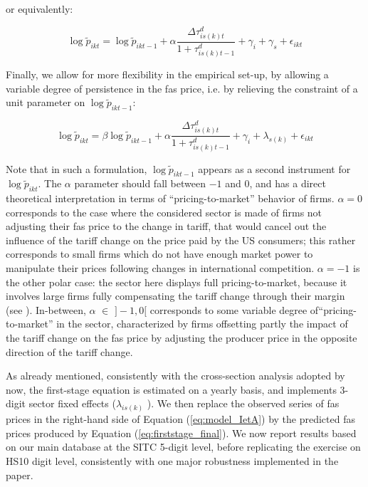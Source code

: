 \documentclass[a4paper,11pt]{article}
\begin{document}
or equivalently:

\begin{equation}
\log \widetilde{p}_{ikt} = \log \widetilde{p}_{ikt-1} + \alpha\frac{\Delta \tau^d_{is(k)t}}{1+\tau_{is(k)t-1}^d} +\gamma_{i} +\gamma_{s}+\epsilon_{ikt} \label{eq:firststage_Deltalog_bis}
\end{equation}

Finally, we allow for more flexibility in the empirical set-up, by allowing a variable degree of persistence in the fas price, i.e. by relieving the constraint of a unit parameter on $\log \widetilde{p}_{ikt-1}$:


\begin{equation}
\log \widetilde{p}_{ikt} = \beta\log \widetilde{p}_{ikt-1} + \alpha\frac{\Delta \tau^d_{is(k)t}}{1+\tau_{is(k)t-1}^d} +\gamma_{i} +\lambda_{s(k)}+\epsilon_{ikt} \label{eq:firststage_final}
\end{equation}

Note that in such a formulation, $\log \widetilde{p}_{ikt-1}$ appears as a second instrument for $\log \widetilde{p}_{ikt}$. The $\alpha$ parameter should fall between $-1$ and $0$, and has a direct theoretical interpretation in terms of ``pricing-to-market'' behavior of firms. $\alpha = 0$ corresponds to the case where the considered sector is made of firms not adjusting their fas price to the change in tariff, that would cancel out the influence of the tariff change on the price paid by the US consumers; this rather corresponds to small firms which do not have enough market power to manipulate their prices following changes in international competition. $\alpha = -1$ is the other polar case: the sector here displays full pricing-to-market, because it involves large firms fully compensating the tariff change through their margin (see \citealp{Berman_Martin_Mayer_2012}).
In-between, $\alpha$ $\in$ $]-1,0[$ corresponds to some variable degree of``pricing-to-market'' in the sector, characterized by firms offsetting partly the impact of the tariff change on the fas price by adjusting the producer price in the opposite direction of the tariff change.

As already mentioned, consistently with the cross-section analysis adopted by now, the first-stage equation is estimated on a yearly basis, and implements 3-digit sector fixed effects ($\lambda_{is(k)}$ ). We then replace the observed series of fas prices in the right-hand side of Equation (\ref{eq:model_IetA}) by the predicted fas prices produced by Equation (\ref{eq:firststage_final}). We now report results based on our main database at the SITC 5-digit level, before replicating the exercise on HS10 digit level, consistently with one major robustness implemented in the paper.
\end{document}
